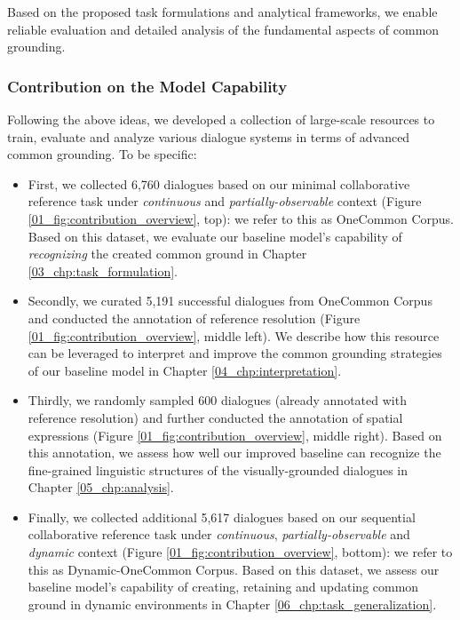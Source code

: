 Based on the proposed task formulations and analytical frameworks, we enable reliable evaluation and detailed analysis of the fundamental aspects of common grounding.

\subsubsection{Contribution on the Model Capability}

Following the above ideas, we developed a collection of large-scale resources to train, evaluate and analyze various dialogue systems in terms of advanced common grounding. To be specific:

\begin{itemize}
  \item First, we collected 6,760 dialogues based on our minimal collaborative reference task under \textit{continuous} and \textit{partially-observable} context (Figure \ref{01_fig:contribution_overview}, top): we refer to this as OneCommon Corpus. Based on this dataset, we evaluate our baseline model's capability of \textit{recognizing} the created common ground in Chapter \ref{03_chp:task_formulation}.

  \item Secondly, we curated 5,191 successful dialogues from OneCommon Corpus and conducted the annotation of reference resolution (Figure \ref{01_fig:contribution_overview}, middle left). We describe how this resource can be leveraged to interpret and improve the common grounding strategies of our baseline model in Chapter \ref{04_chp:interpretation}.

  \item Thirdly, we randomly sampled 600 dialogues (already annotated with reference resolution) and further conducted the annotation of spatial expressions (Figure \ref{01_fig:contribution_overview}, middle right). Based on this annotation, we assess how well our improved baseline can recognize the fine-grained linguistic structures of the visually-grounded dialogues in Chapter \ref{05_chp:analysis}.

  \item Finally, we collected additional 5,617 dialogues based on our sequential collaborative reference task under \textit{continuous}, \textit{partially-observable} and \textit{dynamic} context (Figure \ref{01_fig:contribution_overview}, bottom): we refer to this as Dynamic-OneCommon Corpus. Based on this dataset, we assess our baseline model's capability of creating, retaining and updating common ground in dynamic environments in Chapter \ref{06_chp:task_generalization}.
\end{itemize}

